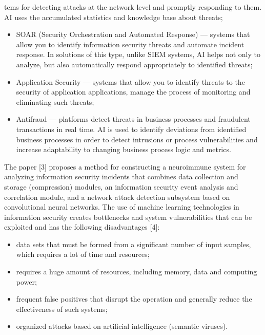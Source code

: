 \documentclass{article}
\date{}
\begin{document}
\begin{multicols}{2}
\begin{description}[leftmargin=!, labelwidth=0.7cm, itemsep=-1.5mm]
tems for detecting attacks at the network level and promptly responding to them. AI uses the accumulated statistics and knowledge base about threats;
\end{description}
\begin{itemize}
    \item SOAR (Security Orchestration and Automated Response) — systems that allow you to identify information security threats and automate incident response. In solutions of this type, unlike SIEM systems, AI helps not only to analyze, but also automatically respond appropriately to identified threats;
    \item Application Security — systems that allow you to identify threats to the security of application applications, manage the process of monitoring and eliminating such threats;
    \item Antifraud — platforms detect threats in business processes and fraudulent transactions in real time. AI is used to identify deviations from identified business processes in order to detect intrusions or process vulnerabilities and increase adaptability to changing business process logic and metrics.
\end {itemize}
\par
The paper [3] proposes a method for constructing a neuroimmune system for analyzing information security incidents that combines data collection and storage (compression) modules, an information security event analysis and correlation module, and a network attack detection subsystem based on convolutional neural networks. The use of machine learning technologies in information security creates bottlenecks and system vulnerabilities that can be exploited and has the following disadvantages [4]:
\begin{itemize}
    \item  data sets that must be formed from a significant
number of input samples, which requires a lot of
time and resources;
     \item requires a huge amount of resources, including
memory, data and computing power;
     \item frequent false positives that disrupt the operation and
generally reduce the effectiveness of such systems;
     \item organized attacks based on artificial intelligence
(semantic viruses).
\end{itemize}

\end{multicols}
\end{document}
